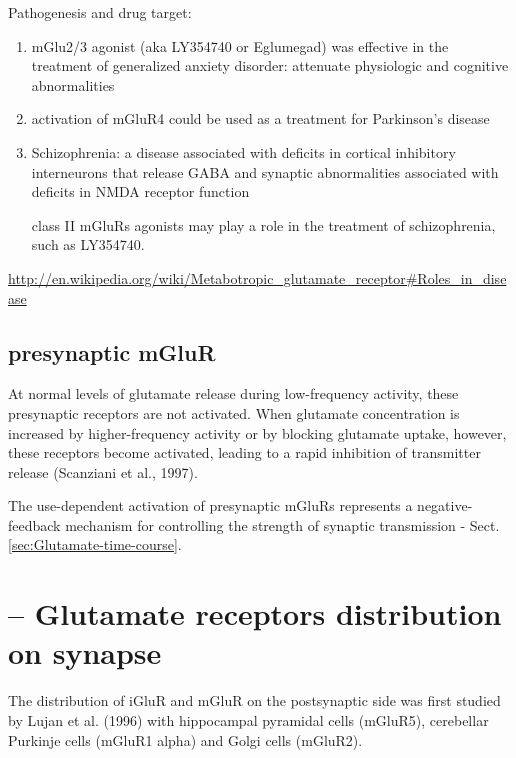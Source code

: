 Pathogenesis and drug target:
\begin{enumerate}
  \item mGlu2/3 agonist (aka LY354740 or Eglumegad) was effective in the
  treatment of generalized anxiety disorder: attenuate physiologic and cognitive
  abnormalities
  
  \item activation of mGluR4 could be used as a treatment for
  Parkinson's disease
  
  \item Schizophrenia: a disease associated with deficits in cortical inhibitory
  interneurons that release GABA and synaptic abnormalities associated with
  deficits in NMDA receptor function
  
  class II mGluRs agonists may play a role in the treatment of
  schizophrenia, such as LY354740.
\end{enumerate}
\url{http://en.wikipedia.org/wiki/Metabotropic_glutamate_receptor#Roles_in_disease}

\subsection{presynaptic mGluR}
\label{sec:mGluR-presynaptic}

At normal levels of glutamate release during low-frequency activity, these
presynaptic receptors are not activated. When glutamate concentration is
increased by higher-frequency activity or by blocking glutamate uptake, however,
these receptors become activated, leading to a rapid inhibition of transmitter
release (Scanziani et al., 1997).

The use-dependent activation of presynaptic mGluRs represents a
negative-feedback mechanism for controlling the strength of synaptic
transmission - Sect.\ref{sec:Glutamate-time-course}.

\section{-- Glutamate receptors distribution on synapse}
\label{sec:glutamate-receptor-distribution-synapse}


The distribution of iGluR and mGluR on the postsynaptic side was first studied
by Lujan et al. (1996) \citep{lujan1996} with hippocampal pyramidal cells
(mGluR5), cerebellar Purkinje cells (mGluR1 alpha) and Golgi cells (mGluR2).

